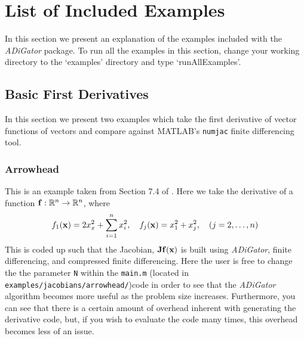 \documentclass[10pt,pdftex]{article}
\begin{document}
\section{List of Included Examples}
In this section we present an explanation of the examples included with the \emph{ADiGator} package.
To run all the examples in this section, change your working directory to the `examples' directory and type `runAllExamples'.
\subsection{Basic First Derivatives}
In this section we present two examples which take the first derivative of vector functions of vectors and compare against MATLAB's \texttt{numjac} finite differencing tool.
\subsubsection{Arrowhead}
This is an example taken from Section 7.4 of \cite{Griewank1}. Here we take the derivative of a function $\mathbf{f}: \mathbb{R}^n \rightarrow \mathbb{R}^n$, where
\begin{equation}
f_1(\mathbf{x}) = 2x^2_x+ \sum^n_{i=1}x_i^2, \quad f_j(\mathbf{x}) = x_1^2 + x_j^2, \quad (j = 2,\dots,n)
\end{equation}
This is coded up such that the Jacobian, $\mathbf{J}\mathbf{f}(\mathbf{x})$ is built using \emph{ADiGator}, finite differencing, and compressed finite differencing. Here the user is free to change the the parameter \texttt{N} within the \texttt{main.m} (located in \texttt{examples/jacobians/arrowhead/})code in order to see that the \emph{ADiGator} algorithm becomes more useful as the problem size increases. Furthermore, you can see that there is a certain amount of overhead inherent with generating the derivative code, but, if you wish to evaluate the code many times, this overhead becomes less of an issue.
\end{document}
